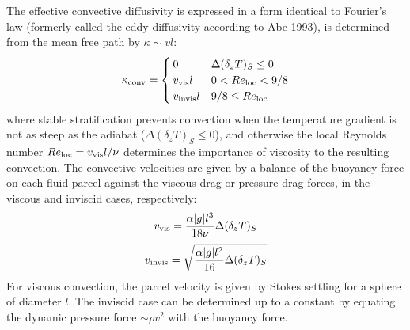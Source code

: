 The effective convective diffusivity is expressed in a form identical to Fourier's law (formerly called the eddy diffusivity according to Abe 1993), is determined from the mean free path by $\kappa \sim v l$:
\begin{equation}
  \kappa_{\rm conv} = \begin{cases}
  0 & \Delta(\delta_z T)_S \leq 0 \\
  v_{\rm vis}l & 0 < {Re}_{\rm loc} < 9/8 \\
  v_{\rm invis}l &  9/8 \leq { Re}_{\rm loc}
\end{cases}
\label{eq:convdiff}
\end{equation}
where stable stratification prevents convection when the temperature gradient is not as steep as the adiabat ($\Delta(\delta_z T)_S \leq 0$), and otherwise the local Reynolds number $Re_{\rm loc} = v_{\rm vis} l / \nu$ determines the importance of viscosity to the resulting convection.
The convective velocities are given by a balance of the buoyancy force on each fluid parcel against the viscous drag or pressure drag forces, in the viscous and inviscid cases, respectively:
\begin{equation}
  v_{\rm vis} = \frac{\alpha |g| l^3}{18\nu}  \Delta(\delta_z T)_S \\
\end{equation}
\begin{equation}
  v_{\rm invis} = \sqrt{\frac{\alpha |g| l^2}{16}  \Delta(\delta_z T)_S} \\
\end{equation}
For viscous convection, the parcel velocity is given by Stokes settling for a sphere of diameter $l$. The inviscid case can be determined up to a constant by equating the dynamic pressure force $\sim$$\rho v^2$ with the buoyancy force.



